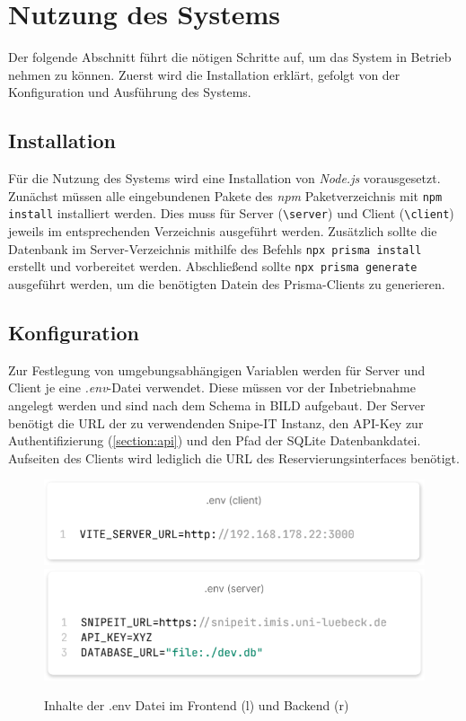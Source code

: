 \section{Nutzung des Systems}
\label{subsec:nutzung}
Der folgende Abschnitt führt die nötigen Schritte auf, um das System in Betrieb nehmen zu können.
Zuerst wird die Installation erklärt, gefolgt von der Konfiguration und Ausführung des Systems.

\subsection{Installation}
Für die Nutzung des Systems wird eine Installation von \textit{Node.js} vorausgesetzt. Zunächst
müssen alle eingebundenen Pakete des \textit{npm} Paketverzeichnis mit \lstinline{npm install}
installiert werden. Dies muss für Server (\lstinline{\server}) und Client (\lstinline{\client})
jeweils im entsprechenden Verzeichnis ausgeführt werden. Zusätzlich sollte die Datenbank im
Server-Verzeichnis mithilfe des Befehls \lstinline{npx prisma install }
erstellt und vorbereitet werden. Abschließend sollte \lstinline{npx prisma generate} ausgeführt
werden, um die benötigten Datein des Prisma-Clients zu generieren.

\subsection{Konfiguration}
Zur Festlegung von umgebungsabhängigen Variablen werden für Server und Client je eine
\textit{.env}-Datei verwendet. Diese müssen vor der Inbetriebnahme angelegt werden und sind nach dem
Schema in BILD aufgebaut. Der Server benötigt die URL der zu verwendenden Snipe-IT Instanz, den
API-Key zur Authentifizierung (\ref{section:api}) und den Pfad der SQLite Datenbankdatei.
Aufseiten des Clients wird lediglich die URL des Reservierungsinterfaces benötigt.
\begin{figure}[h]
  \centering
  \includegraphics[scale=0.3]{Bilder/Code/client.png}
  \includegraphics[scale=0.3]{Bilder/Code/sever.png}
  \caption[Inhalte der .env Datei im Frontend (links) und Backend (rechts)]{Inhalte der .env Datei im Frontend (l) und Backend (r)}
  \label{fig:env}
\end{figure}



